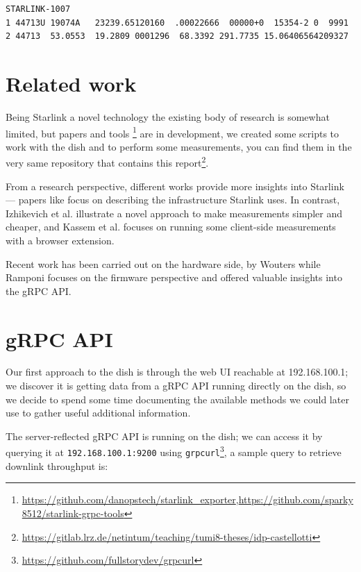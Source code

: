 \documentclass[IN,11pt,twoside,openright,idp,english]{tumthesis}
\begin{document}
\begin{lstlisting}[caption={TLE for satellite STARLINK-1007 },captionpos=b]
STARLINK-1007           
1 44713U 19074A   23239.65120160  .00022666  00000+0  15354-2 0  9991
2 44713  53.0553  19.2809 0001296  68.3392 291.7735 15.06406564209327
\end{lstlisting}
    
\section{Related work}
    
Being Starlink a novel technology the existing body of research is somewhat limited, but papers and tools \footnote{\url{https://github.com/danopstech/starlink\_exporter},\url{https://github.com/sparky8512/starlink-grpc-tools}} are in development, we created some scripts to work with the dish and to perform some measurements, you can find them in the very same repository that contains this report\footnote{\url{https://gitlab.lrz.de/netintum/teaching/tumi8-theses/idp-castellotti}}.
    
From a research perspective, different works provide more insights into Starlink — papers like \cite{pan2023measuring} focus on describing the infrastructure Starlink uses. In contrast, Izhikevich et al. \cite{izhikevich2023democratizing} illustrate a novel approach to make measurements simpler and cheaper, and Kassem et al.\cite{browser-side} focuses on running some client-side measurements with a browser extension.
    
Recent work has been carried out on the hardware side, by Wouters \cite{glitching} while Ramponi \cite{quarkslab} focuses on the firmware perspective and offered valuable insights into the gRPC API.
    
\section{gRPC API}
    
Our first approach to the dish is through the web UI reachable at 192.168.100.1; we discover it is getting data from a gRPC API running directly on the dish, so we decide to spend some time documenting the available methods we could later use to gather useful additional information.
    
The server-reflected gRPC API is running on the dish; we can access it by querying it at \texttt{192.168.100.1:9200} using \texttt{grpcurl}\footnote{\url{https://github.com/fullstorydev/grpcurl}}, a sample query to retrieve downlink throughput is:
    
\end{document}
